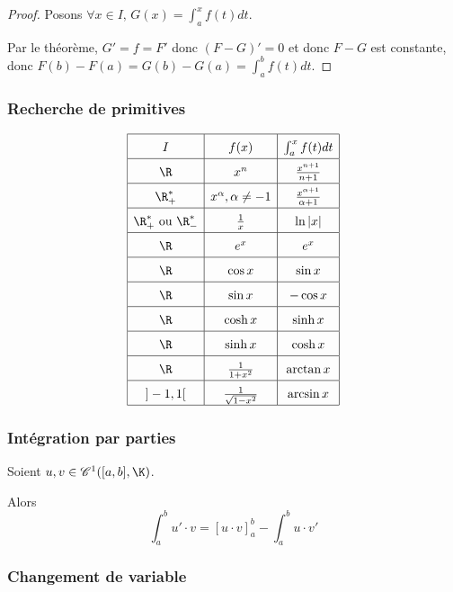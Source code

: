 
\begin{proof}
    Posons $\forall x \in I, \, G(x) = \int_a^x f(t) dt$.

    Par le théorème, $G' = f = F'$ donc $(F - G)' = 0$ et donc $F - G$ est constante, 
    donc $F(b) - F(a) = G(b) - G(a) = \int_a^b f(t) dt$.
\end{proof}


\subsubsection{Recherche de primitives }

$$\renewcommand{\arraystretch}{1.6}
\begin{array}{|c|c|c|}
    \hline
    I & f(x) & \int_{a }^{x } f(t) dt \\
    \hline
    \R & x^n & \frac{x^{n+1}}{n + 1} \\
    \hline
    \R^*_+ & x^\alpha, \alpha \neq -1 & \frac{x^{\alpha + 1}}{\alpha + 1} \\
    \hline
    \R^*_+ \text{ ou } \R_-^*& \frac 1 x & \ln |x| \\
    \hline
    \R & e^x & e^x \\
    \hline
    \R & \cos x & \sin x \\
    \hline
    \R & \sin x & -\cos x \\
    \hline
    \R & \cosh x & \sinh x \\
    \hline
    \R & \sinh x & \cosh x \\
    \hline
    \R & \frac 1 {1 + x^2} & \arctan x \\
    \hline
    ]-1, 1[ & \frac 1 {\sqrt{1 - x^2}} & \arcsin x\\
    \hline
\end{array}$$

\subsubsection{Intégration par parties }

Soient $u, v \in \mathscr C^1([a, b], \K)$.

Alors $$\int_{a }^{b } u'\cdot v = \left[ u \cdot v \right]_{a }^{b } - \int_{a }^{b } u \cdot v'$$

\subsubsection{Changement de variable }

